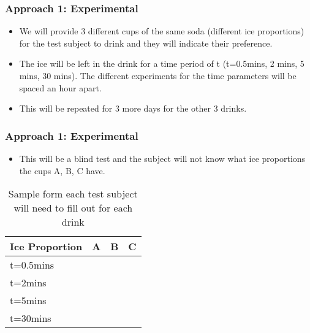 \documentclass[compress,handout,10pt]{beamer}
\let\olditem\item
\renewcommand{\item}{\setlength{\itemsep}{0.5\baselineskip}\olditem}
\begin{document}
\begin{frame}
    \frametitle{Approach 1: Experimental}

\begin {itemize}

\item We will provide 3 different cups of the same soda (different ice proportions) for the test subject to drink and they will indicate their preference. 
\item The ice will be left in the drink for a time period of t (t=0.5mins, 2 mins, 5 mins, 30 mins). The different experiments for the time parameters will be spaced an hour apart.
\item This will be repeated for 3 more days for the other 3 drinks.
\end{itemize}
\end{frame}

\begin{frame}
    \frametitle{Approach 1: Experimental}

\begin {itemize}

\item This will be a blind test and the subject will not know what ice proportions the cups A, B, C have.
\end{itemize}
\vspace{6pt}

\begin{table}[ h]
\centering
\begin{tabular}{ l | c|c|c }
  Ice Proportion & A  & B & C  \\
\hline  
t=0.5mins & & &\\ 
\hline  
t=2mins & & &\\ 
\hline  
t=5mins  & & &\\ 
\hline  
t=30mins & & &\\ 
\hline  
   
 \end{tabular}
\caption{Sample form each test subject will need to fill out for each drink}

\end{table}

\end{frame}
\end{document}
